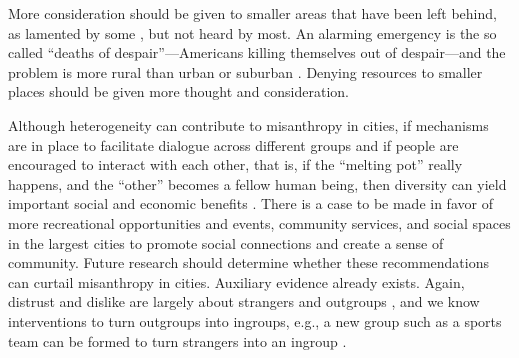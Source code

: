 \documentclass[11pt, letterpaper]{article}
\begin{document}
\begin{spacing}{1.4}

 More consideration
should be given to smaller areas that have been left behind, as lamented by some
\citep[e.g.,][]{fullerNYT17monD,hansonCityJournalautumn15}, but not heard by
most.
 An alarming emergency is the so called ``deaths of despair''---Americans killing
 themselves out of despair---and the problem is more rural than urban or
 suburban \citep{case15,case20}.
Denying resources to smaller places should be given more thought and consideration.
 
Although heterogeneity can contribute to misanthropy in cities, if mechanisms
are in place to facilitate dialogue across different groups and if people are
encouraged to interact with each other, that is, if the ``melting pot'' really
happens, and the ``other'' becomes a fellow human being, then diversity can
yield important social and economic benefits \citep{rodriguez2019does}.  
There is a case to be made in favor of more recreational opportunities and
events, community services, and social spaces in the largest cities to promote
social connections and create a sense of community.  Future research should
determine whether these recommendations can curtail misanthropy in
cities. Auxiliary evidence already exists. Again, distrust and dislike are largely about
strangers and outgroups \citep{wilson85, delhey11}, and we know interventions to
turn outgroups into ingroups, e.g., a new group such as a sports team can be
 formed to turn strangers into an ingroup \citep[e.g.,][]{smith10}.


\end{spacing}
\end{document}
